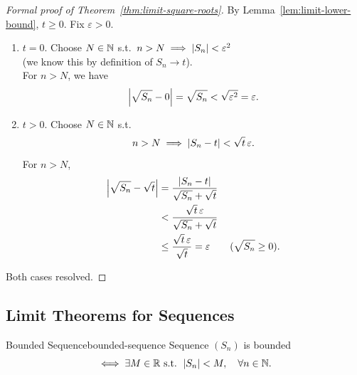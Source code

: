 \begin{proof}[Formal proof of Theorem~\ref{thm:limit-square-roots}]
  By Lemma~\ref{lem:limit-lower-bound}, $t\ge0$. Fix $\varepsilon>0$.
  \begin{enumerate}[label=Case \arabic*., proofparts]
    \item $t=0$. Choose $N\in\mathbb{N}$ s.t.\ $n>N\implies\left\lvert S_n \right\rvert<\varepsilon^2$\\
          (we know this by definition of $S_n\to t$).\\
          For $n>N$, we have
          \[
            \left\lvert \sqrt{S_n}-0 \right\rvert=\sqrt{S_n}<\sqrt{\varepsilon^2}=\varepsilon.
          \]
    \item $t>0$. Choose $N\in\mathbb{N}$ s.t.
          \[
            n>N\implies\left\lvert S_n-t \right\rvert<\sqrt{t}\,\varepsilon.
          \]
          For $n>N$,
          \begin{align*}
            \left\lvert \sqrt{S_n}-\sqrt{t} \right\rvert
             & =\frac{\left\lvert S_n-t \right\rvert}{\sqrt{S_n}+\sqrt{t}}              \\
             & <\frac{\sqrt{t}\,\varepsilon}{\sqrt{S_n}+\sqrt{t}}    \\
             & \le\frac{\sqrt{t}\,\varepsilon}{\sqrt{t}}=\varepsilon
            \qquad(\sqrt{S_n}\ge0).
          \end{align*}
  \end{enumerate}
  Both cases resolved.
\end{proof}

\subsection{Limit Theorems for Sequences}

\begin{definition}{Bounded Sequence}{bounded-sequence}
  Sequence $(S_n)$ is bounded
  \[
    \iff\exists M\in\mathbb{R}\text{ s.t. }\left\lvert S_n \right\rvert<M,\quad\forall n\in\mathbb{N}.
  \]
  \begin{center}
  \end{center}
\end{definition}

